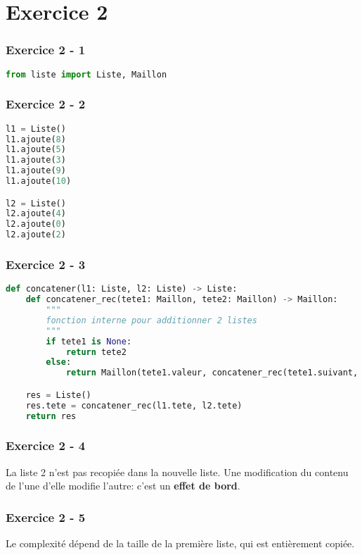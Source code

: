 \documentclass[svgnames,11pt]{beamer}
\begin{document}
\section{Exercice 2}
\begin{frame}[fragile]
    \frametitle{Exercice 2 - 1}

\begin{lstlisting}[language=Python , basicstyle=\ttfamily\small, xleftmargin=2em, xrightmargin=2em]
from liste import Liste, Maillon
\end{lstlisting}    

\end{frame}
\begin{frame}[fragile]
    \frametitle{Exercice 2 - 2}

\begin{lstlisting}[language=Python , basicstyle=\ttfamily\small, xleftmargin=2em, xrightmargin=2em]
l1 = Liste()
l1.ajoute(8)
l1.ajoute(5)
l1.ajoute(3)
l1.ajoute(9)
l1.ajoute(10)

l2 = Liste()
l2.ajoute(4)
l2.ajoute(0)
l2.ajoute(2)
\end{lstlisting}    

\end{frame}
\begin{frame}[fragile]
    \frametitle{Exercice 2 - 3}

\begin{lstlisting}[language=Python , basicstyle=\ttfamily\small, xleftmargin=1em, xrightmargin=0em]
def concatener(l1: Liste, l2: Liste) -> Liste:
    def concatener_rec(tete1: Maillon, tete2: Maillon) -> Maillon:
        """
        fonction interne pour additionner 2 listes
        """
        if tete1 is None:
            return tete2
        else:
            return Maillon(tete1.valeur, concatener_rec(tete1.suivant, tete2))

    res = Liste()
    res.tete = concatener_rec(l1.tete, l2.tete)
    return res
\end{lstlisting}    

\end{frame}
\begin{frame}
    \frametitle{Exercice 2 - 4}

La liste 2 n'est pas recopiée dans la nouvelle liste. Une modification du contenu de l'une d'elle modifie l'autre: c'est un \textbf{effet de bord}.

\end{frame}
\begin{frame}
    \frametitle{Exercice 2 - 5}

Le complexité dépend de la taille de la première liste, qui est entièrement copiée.

\end{frame}
\end{document}
